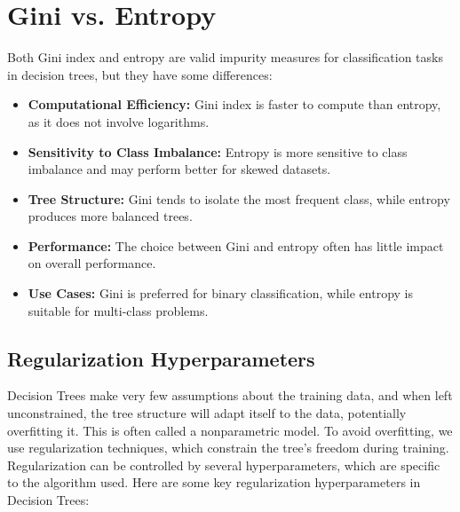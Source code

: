 \documentclass{article}
\begin{document}
\section*{Gini vs. Entropy}
Both Gini index and entropy are valid impurity measures for classification tasks in decision trees, but they have some differences:
\begin{itemize}
    \item \textbf{Computational Efficiency:} Gini index is faster to compute than entropy, as it does not involve logarithms.
    \item \textbf{Sensitivity to Class Imbalance:} Entropy is more sensitive to class imbalance and may perform better for skewed datasets.
    \item \textbf{Tree Structure:} Gini tends to isolate the most frequent class, while entropy produces more balanced trees.
    \item \textbf{Performance:} The choice between Gini and entropy often has little impact on overall performance.
    \item \textbf{Use Cases:} Gini is preferred for binary classification, while entropy is suitable for multi-class problems.
\end{itemize}

\subsection*{Regularization Hyperparameters}
Decision Trees make very few assumptions about the training data, and when left unconstrained, the tree structure will adapt itself to the data, potentially overfitting it. This is often called a nonparametric model. To avoid overfitting, we use regularization techniques, which constrain the tree's freedom during training. Regularization can be controlled by several hyperparameters, which are specific to the algorithm used. Here are some key regularization hyperparameters in Decision Trees:
\end{document}
